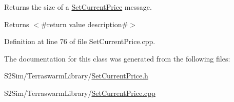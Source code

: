 Returns the size of a \hyperlink{class_terra_swarm_1_1_synchronous_1_1_set_current_price}{Set\-Current\-Price} message. 

\begin{DoxyReturn}{Returns}
$<$\#return value description\#$>$ 
\end{DoxyReturn}


Definition at line 76 of file Set\-Current\-Price.\-cpp.



The documentation for this class was generated from the following files\-:\begin{DoxyCompactItemize}
\item 
S2\-Sim/\-Terraswarm\-Library/\hyperlink{_set_current_price_8h}{Set\-Current\-Price.\-h}\item 
S2\-Sim/\-Terraswarm\-Library/\hyperlink{_set_current_price_8cpp}{Set\-Current\-Price.\-cpp}\end{DoxyCompactItemize}
